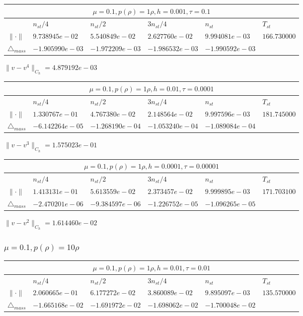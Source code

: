 \begin{tabular}{*{6}{|l}|}
    \hline
     \\
    \hline
    &$n_{st}/4 $&$ n_{st}/2$&$3n_{st}/4$&$n_{st}$&$T_{st}$ \\
    \hline
$\|\cdot \|$& $9.738945e-02$ & $5.540849e-02$ & $2.627760e-02$ & $9.994081e-03$ &$166.730000$\\
\hline
$\triangle_{mass}$& $-1.905990e-03$ & $-1.972209e-03$ & $-1.986532e-03$ & $-1.990592e-03$ &\\
\hline
\end{tabular}

$\|v-v^{4}\|_{C_h} = 4.879192e-03$

\begin{tabular}{*{6}{|l}|}
    \hline
     \\
    \hline
    &$n_{st}/4 $&$ n_{st}/2$&$3n_{st}/4$&$n_{st}$&$T_{st}$ \\
    \hline
    $\|\cdot \|$& $1.330767e-01$ & $4.767380e-02$ & $2.148564e-02$ & $9.997596e-03$ &$181.745000$\\
\hline
$\triangle_{mass}$& $-6.142264e-05$ & $-1.268190e-04$ & $-1.053240e-04$ & $-1.089084e-04$ &\\
\hline
\end{tabular}

$\|v-v^{3}\|_{C_h} = 1.575023e-01$

\begin{tabular}{*{6}{|l}|}
    \hline
     \\
    \hline
    &$n_{st}/4 $&$ n_{st}/2$&$3n_{st}/4$&$n_{st}$&$T_{st}$ \\
    \hline
$\|\cdot \|$& $1.413131e-01$ & $5.613559e-02$ & $2.373457e-02$ & $9.999895e-03$ &$171.703100$\\
\hline
$\triangle_{mass}$& $-2.470201e-06$ & $-9.384597e-06$ & $-1.226752e-05$ & $-1.096265e-05$ &\\
\hline
\end{tabular}

$\|v-v^{2}\|_{C_h} = 1.614460e-02$

\subsubsection{$\mu = 0.1, p(\rho) = 10\rho $}

\begin{tabular}{*{6}{|l}|}
    \hline
     \\
    \hline
    &$n_{st}/4 $&$ n_{st}/2$&$3n_{st}/4$&$n_{st}$&$T_{st}$ \\
    \hline
$\|\cdot \|$& $2.060665e-01$ & $6.177272e-02$ & $3.860089e-02$ & $9.895097e-03$ &$135.570000$\\
\hline
$\triangle_{mass}$& $-1.665168e-02$ & $-1.691972e-02$ & $-1.698062e-02$ & $-1.700048e-02$ &\\
\hline    
\end{tabular}

